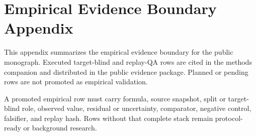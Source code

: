 \section{Empirical Evidence Boundary Appendix}

\label{sec:oc-core-1-3-empirical-evidence-boundary-appendix}

This appendix summarizes the empirical evidence boundary for the public monograph. Executed target-blind and replay-QA rows are cited in the methods companion and distributed in the public evidence package. Planned or pending rows are not promoted as empirical validation.


A promoted empirical row must carry formula, source snapshot, split or target-blind role, observed value, residual or uncertainty, comparator, negative control, falsifier, and replay hash. Rows without that complete stack remain protocol-ready or background research.
